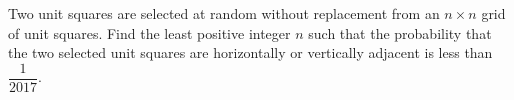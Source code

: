 Two unit squares are selected at random without replacement from an $n\times n$ grid of unit squares. Find the least positive integer $n$ such that the probability that the two selected unit squares are horizontally or vertically adjacent is less than $\dfrac{1}{2017}$.
